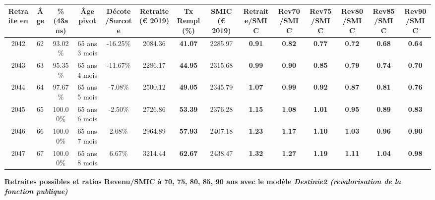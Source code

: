 \begin{adjustbox}{max width=\textwidth} 
\begin{tabular}[htb]{|c|c||c|c|c||c|c||c||c|c|c|c|c|c|} 
\hline 
 Retraite en &  Âge &  \%(43ans) &  Âge pivot &  Décote/Surcote &  Retraite (\euro{} 2019) &  Tx Rempl(\%) &  SMIC (\euro{} 2019) &  Retraite/SMIC &  Rev70/SMIC &  Rev75/SMIC &  Rev80/SMIC &  Rev85/SMIC &  Rev90/SMIC \\ 
\hline \hline 
 2042 &  62 &  93.02\% &  65 ans 3 mois &  -16.25\% &  2084.36 &  {\bf 41.07} &  2285.97 &  {\bf {\color{red} 0.91}} &  {\bf {\color{red} 0.82}} &  {\bf {\color{red} 0.77}} &  {\bf {\color{red} 0.72}} &  {\bf {\color{red} 0.68}} &  {\bf {\color{red} 0.64}} \\ 
\hline 
 2043 &  63 &  95.35\% &  65 ans 4 mois &  -11.67\% &  2286.17 &  {\bf 44.95} &  2315.68 &  {\bf {\color{red} 0.99}} &  {\bf {\color{red} 0.90}} &  {\bf {\color{red} 0.85}} &  {\bf {\color{red} 0.79}} &  {\bf {\color{red} 0.74}} &  {\bf {\color{red} 0.70}} \\ 
\hline 
 2044 &  64 &  97.67\% &  65 ans 5 mois &  -7.08\% &  2500.12 &  {\bf 49.05} &  2345.79 &  {\bf 1.07} &  {\bf {\color{red} 0.99}} &  {\bf {\color{red} 0.92}} &  {\bf {\color{red} 0.87}} &  {\bf {\color{red} 0.81}} &  {\bf {\color{red} 0.76}} \\ 
\hline 
 2045 &  65 &  100.00\% &  65 ans 6 mois &  -2.50\% &  2726.86 &  {\bf 53.39} &  2376.28 &  {\bf 1.15} &  {\bf 1.08} &  {\bf 1.01} &  {\bf {\color{red} 0.95}} &  {\bf {\color{red} 0.89}} &  {\bf {\color{red} 0.83}} \\ 
\hline 
 2046 &  66 &  100.00\% &  65 ans 7 mois &  2.08\% &  2964.89 &  {\bf 57.93} &  2407.18 &  {\bf 1.23} &  {\bf 1.17} &  {\bf 1.10} &  {\bf 1.03} &  {\bf {\color{red} 0.96}} &  {\bf {\color{red} 0.90}} \\ 
\hline 
 2047 &  67 &  100.00\% &  65 ans 8 mois &  6.67\% &  3214.44 &  {\bf 62.67} &  2438.47 &  {\bf 1.32} &  {\bf 1.27} &  {\bf 1.19} &  {\bf 1.11} &  {\bf 1.04} &  {\bf {\color{red} 0.98}} \\ 
\hline 
\hline 
\end{tabular} 
\end{adjustbox} 
 
 \vspace{0.1cm} 
{\bf \noindent Retraites possibles et ratios Revenu/SMIC à 70, 75, 80, 85, 90 ans avec le modèle \emph{Destinie2 (revalorisation de la fonction publique)}}  
 

